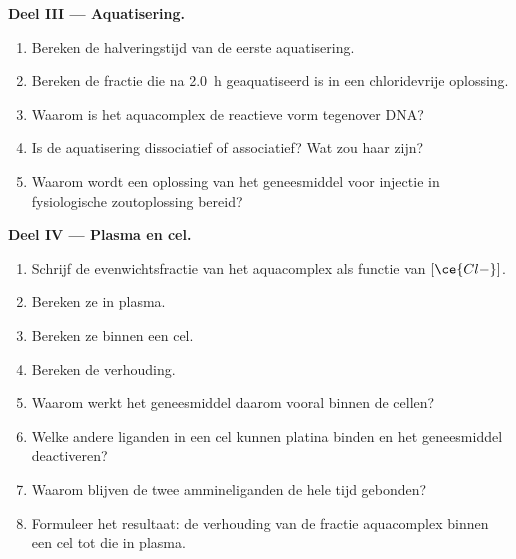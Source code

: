 \begin{problem}
\medskip\noindent\textbf{Deel III --- Aquatisering.}
\begin{enumerate}[resume]
  \item Bereken de halveringstijd van de eerste aquatisering.
  \item Bereken de fractie die na \qty{2.0}{h} geaquatiseerd is in een
        chloridevrije oplossing.
  \item Waarom is het aquacomplex de reactieve vorm tegenover DNA?
  \item Is de aquatisering dissociatief of associatief? Wat zou haar
         zijn?
  \item Waarom wordt een oplossing van het geneesmiddel voor injectie in
        fysiologische zoutoplossing bereid?
\end{enumerate}

\medskip\noindent\textbf{Deel IV --- Plasma en cel.}
\begin{enumerate}[resume]
  \item Schrijf de evenwichtsfractie van het aquacomplex als functie van
        $[\ce{Cl-}]$.
  \item Bereken ze in plasma.
  \item Bereken ze binnen een cel.
  \item Bereken de verhouding.
  \item Waarom werkt het geneesmiddel daarom vooral binnen de cellen?
  \item Welke andere liganden in een cel kunnen platina binden en het
        geneesmiddel deactiveren?
  \item Waarom blijven de twee ammineliganden de hele tijd gebonden?
  \item Formuleer het resultaat: de verhouding van de fractie aquacomplex
        binnen een cel tot die in plasma.
\end{enumerate}
\end{problem}
